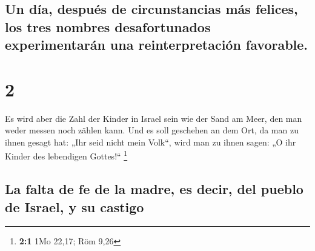 \hypertarget{un-duxeda-despuuxe9s-de-circunstancias-muxe1s-felices-los-tres-nombres-desafortunados-experimentaruxe1n-una-reinterpretaciuxf3n-favorable.}{%
\subsection{Un día, después de circunstancias más felices, los tres
nombres desafortunados experimentarán una reinterpretación
favorable.}\label{un-duxeda-despuuxe9s-de-circunstancias-muxe1s-felices-los-tres-nombres-desafortunados-experimentaruxe1n-una-reinterpretaciuxf3n-favorable.}}

\hypertarget{section-1}{%
\section{2}\label{section-1}}

 Es wird aber die Zahl der Kinder in Israel sein wie der
Sand am Meer, den man weder messen noch zählen kann. Und es soll
geschehen an dem Ort, da man zu ihnen gesagt hat: „Ihr seid nicht mein
Volk``, wird man zu ihnen sagen: „O ihr Kinder des lebendigen
Gottes!{}`` \footnote{\textbf{2:1} 1Mo 22,17; Röm 9,26}

\hypertarget{la-falta-de-fe-de-la-madre-es-decir-del-pueblo-de-israel-y-su-castigo}{%
\subsection{La falta de fe de la madre, es decir, del pueblo de Israel,
y su
castigo}\label{la-falta-de-fe-de-la-madre-es-decir-del-pueblo-de-israel-y-su-castigo}}

